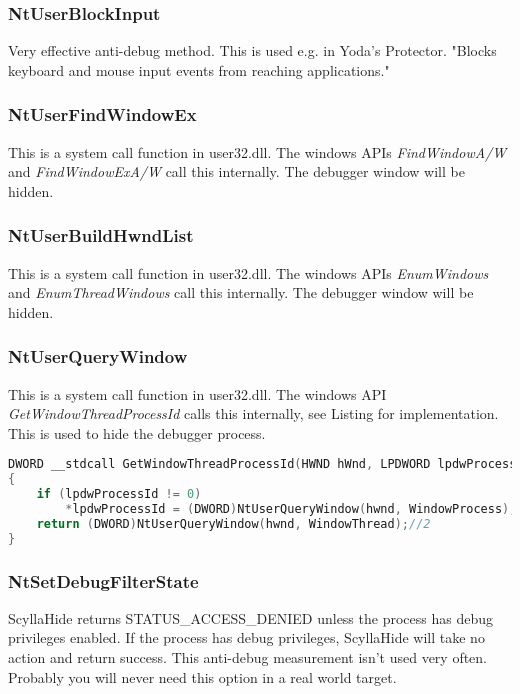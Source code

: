 \documentclass[10pt,a4paper]{article}
\begin{document}
\subsubsection{NtUserBlockInput}
Very effective anti-debug method. This is used e.g. in Yoda's Protector. "Blocks keyboard and mouse input events from reaching applications."

\subsubsection{NtUserFindWindowEx}
This is a system call function in user32.dll. The windows APIs \textit{FindWindowA/W} and \textit{FindWindowExA/W} call this internally. The debugger window will be hidden.

\subsubsection{NtUserBuildHwndList}
This is a system call function in user32.dll. The windows APIs \textit{EnumWindows} and \textit{EnumThreadWindows} call this internally. The debugger window will be hidden.

\subsubsection{NtUserQueryWindow}
This is a system call function in user32.dll. The windows API \textit{GetWindowThreadProcessId} calls this internally, see Listing for implementation. This is used to hide the debugger process.

\begin{lstlisting}[language=C, caption=GetWindowThreadProcessId Implementation]
DWORD __stdcall GetWindowThreadProcessId(HWND hWnd, LPDWORD lpdwProcessId)
{
	if (lpdwProcessId != 0)
		*lpdwProcessId = (DWORD)NtUserQueryWindow(hwnd, WindowProcess);//0
	return (DWORD)NtUserQueryWindow(hwnd, WindowThread);//2
}
\end{lstlisting}

\subsubsection{NtSetDebugFilterState}
ScyllaHide returns STATUS\_ACCESS\_DENIED unless the process has debug privileges enabled. If the process has debug privileges, ScyllaHide will take no action and return success. This anti-debug measurement isn't used very often. Probably you will never need this option in a real world target.
\end{document}

